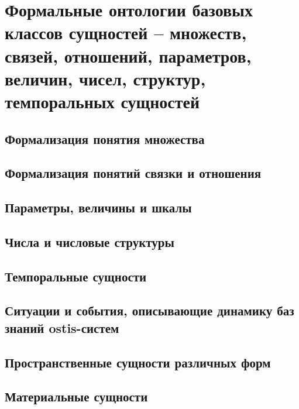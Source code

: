 \chapter{Формальные онтологии базовых классов сущностей -- множеств, связей, отношений, параметров, величин, чисел, структур, темпоральных сущностей}
\label{chapter_top_ontologies}


\section{Формализация понятия множества}
\section{Формализация понятий связки и отношения}
\section{Параметры, величины и шкалы}
\section{Числа и числовые структуры}
\section{Темпоральные сущности}
\section{Ситуации и события, описывающие динамику баз знаний ostis-систем}
\section{Пространственные сущности различных форм}
\section{Материальные сущности}

%
